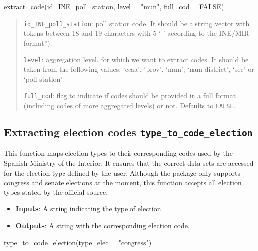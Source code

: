 \documentclass[
  letterpaper,
  DIV=11,
  numbers=noendperiod]{scrreprt}
\newenvironment{Shaded}{\begin{snugshade}}{\end{snugshade}}
\newcommand{\AttributeTok}[1]{\textcolor[rgb]{0.40,0.45,0.13}{#1}}
\newcommand{\ConstantTok}[1]{\textcolor[rgb]{0.56,0.35,0.01}{#1}}
\newcommand{\FunctionTok}[1]{\textcolor[rgb]{0.28,0.35,0.67}{#1}}
\newcommand{\NormalTok}[1]{\textcolor[rgb]{0.00,0.23,0.31}{#1}}
\newcommand{\StringTok}[1]{\textcolor[rgb]{0.13,0.47,0.30}{#1}}
\providecommand{\tightlist}{%
  \setlength{\itemsep}{0pt}\setlength{\parskip}{0pt}}\usepackage{longtable,booktabs,array}
\begin{document}
\begin{Shaded}
\begin{Highlighting}[]
\FunctionTok{extract\_code}\NormalTok{(id\_INE\_poll\_station, }\AttributeTok{level =} \StringTok{"mun"}\NormalTok{, }\AttributeTok{full\_cod =} \ConstantTok{FALSE}\NormalTok{)}
\end{Highlighting}
\end{Shaded}

\begin{quote}
\texttt{id\_INE\_poll\_station}: poll station code. It should be a
string vector with tokens between 18 and 19 characters with 5 `-'
according to the INE/MIR format'').

\texttt{level}: aggregation level, for which we want to extract codes.
It should be taken from the following values: `ccaa', `prov', `mun',
`mun-district', `sec' or `poll-station'

\texttt{full\_cod}: flag to indicate if codes should be provided in a
full format (including codes of more aggregated levels) or not. Defaults
to \texttt{FALSE}.
\end{quote}

\hypertarget{extracting-election-codes-type_to_code_election}{%
\subsection{\texorpdfstring{Extracting election codes
\texttt{type\_to\_code\_election}}{Extracting election codes type\_to\_code\_election}}\label{extracting-election-codes-type_to_code_election}}

This function maps election types to their corresponding codes used by
the Spanish Ministry of the Interior. It ensures that the correct data
sets are accessed for the election type defined by the user. Although
the package only supports congress and senate elections at the moment,
this function accepts all election types stated by the official source.

\begin{itemize}
\tightlist
\item
  \textbf{Inputs}: A string indicating the type of election.
\item
  \textbf{Outputs}: A string with the corresponding election code.
\end{itemize}

\begin{Shaded}
\begin{Highlighting}[]
\FunctionTok{type\_to\_code\_election}\NormalTok{(}\AttributeTok{type\_elec =} \StringTok{"congress"}\NormalTok{)}
\end{Highlighting}
\end{Shaded}
\end{document}
